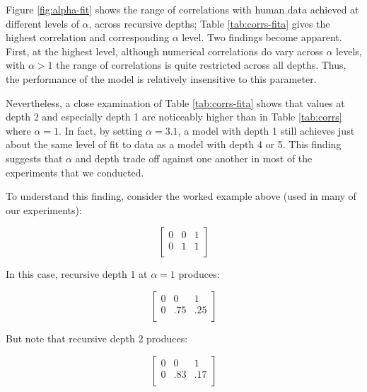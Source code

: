\documentclass[man,noapacite]{apa2}
\begin{document}
Figure \ref{fig:alpha-fit} shows the range of correlations with human data achieved at different levels of $\alpha$, across recursive depths; Table \ref{tab:corrs-fita} gives the highest correlation and corresponding $\alpha$ level. Two findings become apparent. First, at the highest level, although numerical correlations do vary across $\alpha$ levels, with $\alpha > 1$ the range of correlations is quite restricted across all depths. Thus, the performance of the model is relatively insensitive to this parameter.

Nevertheless, a close examination of Table \ref{tab:corrs-fita} shows that values at depth 2 and especially depth 1 are noticeably higher than in Table \ref{tab:corrs} where $\alpha=1$. In fact, by setting $\alpha=3.1$, a model with depth 1 still achieves just about the same level of fit to data as a model with depth 4 or 5. This finding suggests that $\alpha$ and depth trade off against one another in most of the experiments that we conducted.

To understand this finding, consider the worked example above (used in many of our experiments):

\begin{equation}
\left[
    \begin{array}{ccc}
      0 & 0 & 1 \\
      0 & 1 & 1\\
    \end{array}
  \right]
\end{equation}

\noindent In this case, recursive depth 1 at $\alpha=1$ produces:

\begin{equation}
\left[
    \begin{array}{ccc}
      0 & 0 & 1 \\
      0 & .75 & .25\\
    \end{array}
  \right]
\end{equation}

\noindent But note that recursive depth 2 produces:

\begin{equation}
\left[
    \begin{array}{ccc}
      0 & 0 & 1 \\
      0 & .83 & .17\\
    \end{array}
  \right]
\end{equation}
\end{document}
